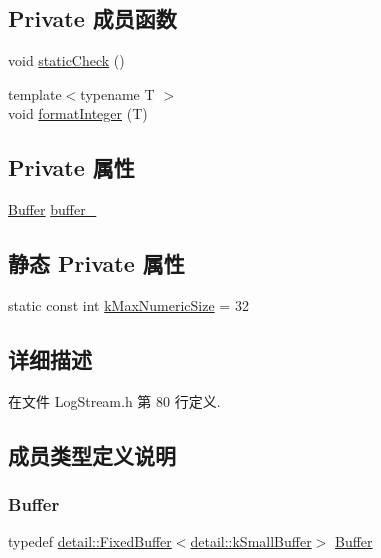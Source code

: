 \subsection*{Private 成员函数}
\begin{DoxyCompactItemize}
\item 
void \hyperlink{classmuduo_1_1LogStream_a5b941530ada1e59155441e50ae6a1404}{static\+Check} ()
\item 
{\footnotesize template$<$typename T $>$ }\\void \hyperlink{classmuduo_1_1LogStream_a0f835c30aa3591182cc7c82a8193cc9f}{format\+Integer} (T)
\end{DoxyCompactItemize}
\subsection*{Private 属性}
\begin{DoxyCompactItemize}
\item 
\hyperlink{classmuduo_1_1LogStream_ad711cf53b5df9fac2d62ecd2b9a8f763}{Buffer} \hyperlink{classmuduo_1_1LogStream_ad2f36135dba583ca36affd1bfc8853be}{buffer\+\_\+}
\end{DoxyCompactItemize}
\subsection*{静态 Private 属性}
\begin{DoxyCompactItemize}
\item 
static const int \hyperlink{classmuduo_1_1LogStream_a4f13d0c6eced96a9efd6622c16498cef}{k\+Max\+Numeric\+Size} = 32
\end{DoxyCompactItemize}


\subsection{详细描述}


在文件 Log\+Stream.\+h 第 80 行定义.



\subsection{成员类型定义说明}
\mbox{\label{classmuduo_1_1LogStream_ad711cf53b5df9fac2d62ecd2b9a8f763}} 
\subsubsection{\texorpdfstring{Buffer}{Buffer}}
{\footnotesize\ttfamily typedef \hyperlink{classmuduo_1_1detail_1_1FixedBuffer}{detail\+::\+Fixed\+Buffer}$<$\hyperlink{namespacemuduo_1_1detail_a01441c3dba82e5d4bad1ce2b39ff576b}{detail\+::k\+Small\+Buffer}$>$ \hyperlink{classmuduo_1_1LogStream_ad711cf53b5df9fac2d62ecd2b9a8f763}{Buffer}}



